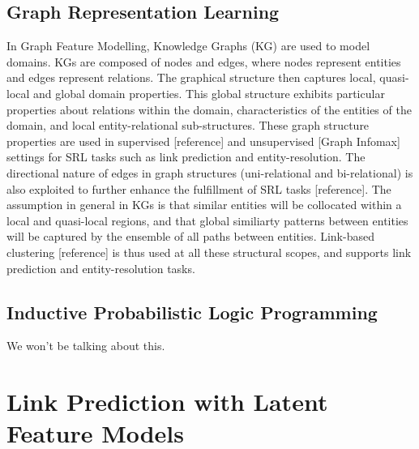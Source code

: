\subsection{Graph Representation Learning} %
In Graph Feature Modelling, Knowledge Graphs (KG) are used to model domains. KGs are composed of nodes and edges, where nodes represent entities and edges represent relations. The graphical structure then captures local, quasi-local and global domain properties. This global structure exhibits particular properties about relations within the domain, characteristics of the entities of the domain, and local entity-relational sub-structures. These graph structure properties are used in supervised [reference] and unsupervised [Graph Infomax] settings for SRL tasks such as link prediction and entity-resolution. The directional nature of edges in graph structures (uni-relational and bi-relational) is also exploited to further enhance the fulfillment of SRL tasks [reference]. The assumption in general in KGs is that similar entities will be collocated within a local and quasi-local regions, and that global similiarty patterns between entities will be captured by the ensemble of all paths between entities. Link-based clustering [reference] is thus used at all these structural scopes, and supports link prediction and entity-resolution tasks. 
\subsection{Inductive Probabilistic Logic Programming}  %
We won't be talking about this.

\section{Link Prediction with Latent Feature Models}  %
\label{section1.3}
